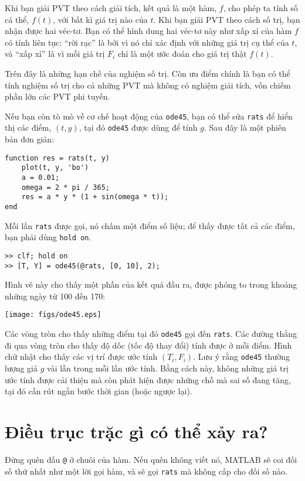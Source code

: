 \documentclass[12pt]{book}
\begin{document}
Khi bạn giải PVT theo cách giải tích, kết quả là một hàm, $f$,
cho phép ta tính số cá thể, $f(t)$, với bất kì giá trị nào của
$t$.  Khi bạn giải PVT theo cách số trị, bạn nhận được hai véc-tơ.
Bạn có thể hình dung hai véc-tơ này như xấp xỉ của hàm $f$ 
có tính liên tục: ``rời rạc'' là bởi vì nó chỉ xác định với những
giá trị cụ thể của $t$, và ``xấp xỉ'' là vì mỗi giá trị $F_i$
chỉ là một ước đoán cho giá trị thật $f(t)$.

Trên đây là những hạn chế của nghiệm số trị. Còn ưu điểm chính
là bạn có thể tính nghiệm số trị cho cả những PVT mà không có
nghiệm giải tích, vốn chiếm phần lớn các PVT phi tuyến.

Nếu bạn còn tò mò về cơ chế hoạt động của {\tt ode45},
bạn có thể sửa {\tt rats} để hiển thị các điểm, $(t, y)$, 
tại đó {\tt ode45} được dùng để tính $g$. Sau đây là một
phiên bản đơn giản:

\begin{verbatim}
function res = rats(t, y)
    plot(t, y, 'bo')
    a = 0.01;
    omega = 2 * pi / 365;
    res = a * y * (1 + sin(omega * t));
end
\end{verbatim}
%
Mỗi lần {\tt rats} được gọi, nó chấm một điểm số liệu; để thấy 
được tất cả các điểm, bạn phải dùng {\tt hold on}.

\begin{verbatim}
>> clf; hold on
>> [T, Y] = ode45(@rats, [0, 10], 2);
\end{verbatim}
%
Hình vẽ này cho thấy một phần của kết quả đầu ra, được phóng to
trong khoảng những ngày từ 100 đến 170:

\centerline{\texttt{[image: figs/ode45.eps]}}

Các vòng tròn cho thấy những điểm tại đó {\tt ode45} gọi đến 
{\tt rats}. Các đường thẳng đi qua vòng tròn cho thấy độ dốc
(tốc độ thay đổi) tính được ở mỗi điểm. Hình chữ nhật cho thấy
các vị trí được ước tính $(T_i, F_i)$.  Lưu ý rằng {\tt ode45}
thường lượng giá $g$ vài lần trong mỗi lần ước tính. Bằng cách
này, không những giá trị ước tính được cải thiện mà còn phát
hiện được những chỗ mà sai số đang tăng, tại đó cần rút ngắn
bước thời gian (hoặc ngược lại).


\section{Điều trục trặc gì có thể xảy ra?}

Đừng quên dấu {\tt @} ở chuôi của hàm. Nếu quên không viết nó,
MATLAB sẽ coi đối số thứ nhất như một lời gọi hàm, và sẽ gọi
{\tt rats} mà không cấp cho đối số nào.
\end{document}
